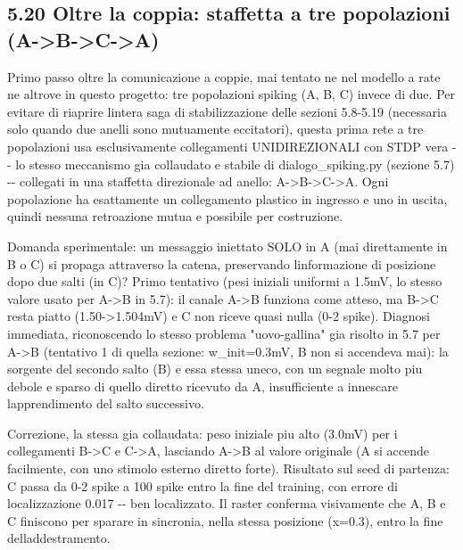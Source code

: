 \documentclass[
  italian,
]{article}
\begin{document}

\subsection{5.20 Oltre la coppia: staffetta a tre popolazioni (A-\textgreater B-\textgreater C-\textgreater A)}\label{oltre-la-coppia-staffetta-a-tre-popolazioni-a-b-c-a}

Primo passo oltre la comunicazione a coppie, mai tentato ne\textquotesingle{} nel modello a rate ne\textquotesingle{} altrove in questo progetto: tre popolazioni spiking (A, B, C) invece di due. Per evitare di riaprire l\textquotesingle intera saga di stabilizzazione delle sezioni 5.8-5.19 (necessaria solo quando due anelli sono mutuamente eccitatori), questa prima rete a tre popolazioni usa esclusivamente collegamenti UNIDIREZIONALI con STDP vera -\/- lo stesso meccanismo gia\textquotesingle{} collaudato e stabile di dialogo\_\allowbreak{}spiking.py (sezione 5.7) -\/- collegati in una staffetta direzionale ad anello: A-\textgreater B-\textgreater C-\textgreater A. Ogni popolazione ha esattamente un collegamento plastico in ingresso e uno in uscita, quindi nessuna retroazione mutua e\textquotesingle{} possibile per costruzione.

Domanda sperimentale: un messaggio iniettato SOLO in A (mai direttamente in B o C) si propaga attraverso la catena, preservando l\textquotesingle informazione di posizione dopo due salti (in C)? Primo tentativo (pesi iniziali uniformi a 1.5mV, lo stesso valore usato per A-\textgreater B in 5.7): il canale A-\textgreater B funziona come atteso, ma B-\textgreater C resta piatto (1.50-\textgreater1.504mV) e C non riceve quasi nulla (0-2 spike). Diagnosi immediata, riconoscendo lo stesso problema "uovo-gallina" gia\textquotesingle{} risolto in 5.7 per A-\textgreater B (tentativo 1 di quella sezione: w\_\allowbreak{}init=0.3mV, B non si accendeva mai): la sorgente del secondo salto (B) e\textquotesingle{} essa stessa un\textquotesingle eco, con un segnale molto piu\textquotesingle{} debole e sparso di quello diretto ricevuto da A, insufficiente a innescare l\textquotesingle apprendimento del salto successivo.

Correzione, la stessa gia\textquotesingle{} collaudata: peso iniziale piu\textquotesingle{} alto (3.0mV) per i collegamenti B-\textgreater C e C-\textgreater A, lasciando A-\textgreater B al valore originale (A si accende facilmente, con uno stimolo esterno diretto forte). Risultato sul seed di partenza: C passa da 0-2 spike a 100 spike entro la fine del training, con errore di localizzazione 0.017 -\/- ben localizzato. Il raster conferma visivamente che A, B e C finiscono per sparare in sincronia, nella stessa posizione (x=0.3), entro la fine dell\textquotesingle addestramento.
\end{document}
